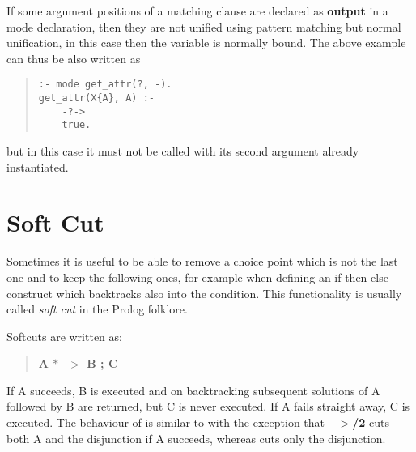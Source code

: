 If some argument positions of a matching clause are declared
as {\bf output} in a mode declaration, then they are not
unified using pattern matching but normal unification,
in this case then the variable is normally bound.
The above example can thus be also written as
\begin{quote}
\begin{verbatim}
:- mode get_attr(?, -).
get_attr(X{A}, A) :-
    -?->
    true.
\end{verbatim}
\end{quote}
but in this case it must not be called with its second argument
already instantiated.


\section{Soft Cut}
Sometimes it is useful to be able to remove a choice point which is
not the last one and to keep the following ones, for example
when defining an if-then-else construct which backtracks also
into the condition.
This functionality is usually called {\it soft cut} in the Prolog
folklore.

Softcuts are written as:
\begin{quote}
{\bf A $*->$ B ; C}
\end{quote}
If A succeeds, B is executed and on backtracking subsequent
solutions of A followed by B are returned, but C is never executed.
If A fails straight away, C is executed.
The behaviour of 
is similar to 
with the exception that {\bf $->$/2}
cuts both A and the disjunction if A succeeds, whereas
cuts only the disjunction.

